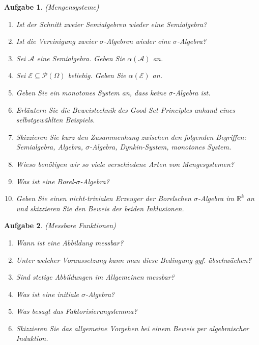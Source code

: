 \documentclass[11pt, a4paper, ngerman]{article}
\newcommand{\R}{\mathbb{R}}
\newtheorem{aufgabe}{Aufgabe}
\begin{document}
    
\begin{aufgabe} (Mengensysteme)
    \begin{enumerate}
        \item 
        Ist der Schnitt zweier Semialgebren wieder eine Semialgebra? 
        \item 
        Ist die Vereinigung zweier $\sigma$-Algebren wieder eine $\sigma$-Algebra? 
        \item 
        Sei $\mathcal{A}$ eine Semialgebra. Geben Sie $\alpha(\mathcal{A})$ an. 
        \item 
        Sei $\mathcal{E} \subseteq \mathcal{P}(\Omega)$ beliebig. Geben Sie $\alpha(\mathcal{E})$ an.
        \item 
        Geben Sie ein monotones System an, dass keine $\sigma$-Algebra ist. 
        \item 
        Erläutern Sie die Beweistechnik des Good-Set-Principles anhand eines selbstgewählten Beispiels.
        \item 
        Skizzieren Sie kurz den Zusammenhang zwischen den folgenden Begriffen: Semialgebra, Algebra, $\sigma$-Algebra, Dynkin-System, monotones System. 
        \item 
        Wieso benötigen wir so viele verschiedene Arten von Mengesystemen? 
        \item 
        Was ist eine Borel-$\sigma$-Algebra? 
        \item 
        Geben Sie einen nicht-trivialen Erzeuger der Borelschen $\sigma$-Algebra im $\R^k$ an und skizzieren Sie den Beweis der beiden Inklusionen. 
    \end{enumerate}
\end{aufgabe}

\begin{aufgabe} (Messbare Funktionen)
    \begin{enumerate}
        \item
        Wann ist eine Abbildung messbar? 
        \item 
        Unter welcher Voraussetzung kann man diese Bedingung ggf. \"abschwächen\"? 
        \item 
        Sind stetige Abbildungen im Allgemeinen messbar? 
        \item
        Was ist eine initiale $\sigma$-Algebra?
        \item 
        Was besagt das Faktorisierungslemma? 
        \item 
        Skizzieren Sie das allgemeine Vorgehen bei einem Beweis per algebraischer Induktion. 
    \end{enumerate}
    
\end{aufgabe}
\end{document}
